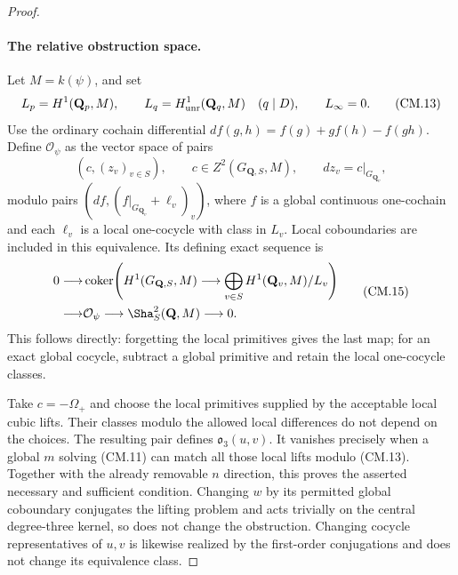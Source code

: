 \begin{proof}
\paragraph{The relative obstruction space.}
Let $M=k(\psi)$, and set
\[
 L_p=H^1(\mathbf Q_p,M),\qquad
 L_q=H^1_{\rm unr}(\mathbf Q_q,M)\quad(q\mid D),
 \qquad L_\infty=0.                                    \tag{CM.13}
\]
Use the ordinary cochain differential
$df(g,h)=f(g)+g f(h)-f(gh)$.
Define $\mathcal O_\psi$ as the vector space of pairs
\[
 (c,(z_v)_{v\in S}),\qquad
 c\in Z^2(G_{\mathbf Q,S},M),\qquad dz_v=c|_{G_{\mathbf Q_v}},
                                                               \tag{CM.14}
\]
modulo pairs
$(df,(f|_{G_{\mathbf Q_v}}+\ell_v)_v)$, where $f$ is a
global continuous one-cochain and each $\ell_v$ is a local
one-cocycle with class in $L_v$.  Local coboundaries are
included in this equivalence.  Its defining exact sequence is
\[
\begin{split}
0\longrightarrow&
 \operatorname{coker}\!\left(
 H^1(G_{\mathbf Q,S},M)\longrightarrow
       \bigoplus_{v\in S}H^1(\mathbf Q_v,M)/L_v\right)\\
\longrightarrow&\mathcal O_\psi
\longrightarrow\Sha^2_S(\mathbf Q,M)\longrightarrow0 .
\end{split}                                                   \tag{CM.15}
\]
This follows directly: forgetting the local primitives gives
the last map; for an exact global cocycle, subtract a global
primitive and retain the local one-cocycle classes.

Take $c=-\Omega_+$ and choose the local primitives supplied
by the acceptable local cubic lifts.  Their classes modulo
the allowed local differences do not depend on the choices.
The resulting pair defines $\mathfrak o_3(u,v)$.
It vanishes precisely when a global $m$ solving (CM.11)
can match all those local lifts modulo (CM.13).
Together with the already removable $n$ direction, this
proves the asserted necessary and sufficient condition.
Changing $w$ by its permitted global coboundary conjugates
the lifting problem and acts trivially on the central
degree-three kernel, so does not change the obstruction.
Changing cocycle representatives of $u,v$ is likewise
realized by the first-order conjugations and does not
change its equivalence class.


\end{proof}
